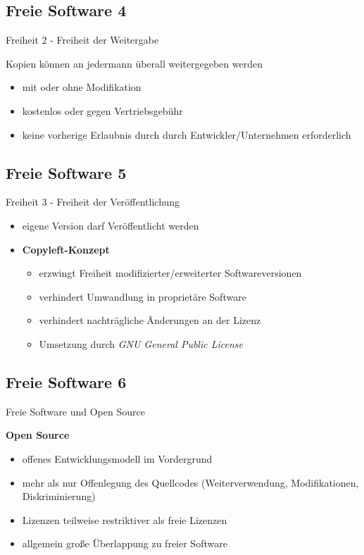 \documentclass[12pt]{beamer}
\begin{document}
\subsection{Freie Software 4}
\begin{frame}{Freiheit 2 - Freiheit der Weitergabe}


Kopien können an jedermann überall weitergegeben werden
\begin{itemize}
\item mit oder ohne Modifikation
\item kostenlos oder gegen Vertriebsgebühr
\item keine vorherige Erlaubnis durch durch Entwickler/Unternehmen erforderlich
\end{itemize}
\end{frame}



\subsection{Freie Software 5}
\begin{frame}{Freiheit 3 - Freiheit der Veröffentlichung}

\begin{itemize}
\item eigene Version darf Veröffentlicht werden
\item \textbf{Copyleft-Konzept}

\begin{itemize}
\item erzwingt Freiheit modifizierter/erweiterter Softwareversionen
\item verhindert Umwandlung in proprietäre Software
\item verhindert nachträgliche Änderungen an der Lizenz
\item Umsetzung durch \emph{GNU General Public License}
\end{itemize}
\end{itemize}
\end{frame}



\subsection{Freie Software 6}
\begin{frame}{Freie Software und Open Source}


\textbf{Open Source}
\begin{itemize}
\item offenes Entwicklungsmodell im Vordergrund
\item mehr als nur Offenlegung des Quellcodes (Weiterverwendung, Modifikationen,
Diskriminierung)
\item Lizenzen teilweise restriktiver als freie Lizenzen
\item allgemein große Überlappung zu freier Software
\end{itemize}
\end{frame}
\end{document}
